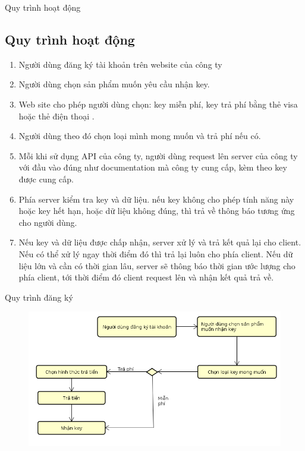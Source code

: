 \documentclass{beamer}
\begin{document}
\begin{frame}{Quy trình hoạt động}
\subsection{Quy trình hoạt động}
\begin{enumerate}
\item Người dùng đăng ký tài khoản trên website của công ty
\item Người dùng chọn sản phẩm muốn yêu cầu nhận key.
\item Web site cho phép người dùng chọn: key miễn phí, key trả phí bằng thẻ visa hoặc thẻ điện thoại . 
\item Người dùng theo đó chọn loại mình mong muốn và trả phí nếu có.
\item Mỗi khi sử dụng API của công ty, người dùng request lên server của công ty với đầu vào đúng như documentation mà công ty cung cấp, kèm theo key được cung cấp.
\item Phía server  kiểm tra key và dữ liệu. nếu key không cho phép tính năng này hoặc key hết hạn, hoặc dữ liệu không đúng, thì trả về thông báo tương ứng cho người dùng.
\item Nếu key và dữ liệu được chấp nhận, server xử lý và trả kết quả lại cho client. Nếu có thể xử lý ngay thời điểm đó thì trả lại luôn cho phía client. Nếu dữ liệu lớn và cần có thời gian lâu, server sẽ thông báo thời gian ước lượng cho phía client, tới thời điểm đó client request lên và nhận kết quả trả về. 

\end{enumerate}
\end{frame}

\begin{frame}{Quy trình đăng ký}
\begin{center}
\begin{figure}
\includegraphics[scale=0.4]{dangky.png}
\end{figure}
\end{center}
\end{frame}
\end{document}

